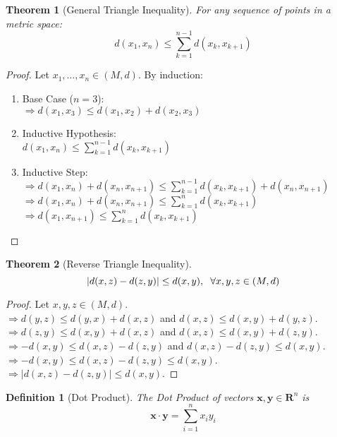 \documentclass{article}
\newtheorem{definition}{Definition}[section]
\newtheorem{theorem}{Theorem}[section]
\begin{document}
			\begin{theorem}[General Triangle Inequality]
			\label{general triangle inequality}
				For any sequence of points in a metric space:
				$$d(x_1,x_n) \leq \sum\limits_{k=1}^{n-1} d(x_k,x_{k+1})$$
			\end{theorem}
			\begin{proof}
				Let $x_1, \ldots, x_n \in (M, d)$. By induction:
				\begin{enumerate}
					\item Base Case ($n = 3$):\\
						$\Rightarrow d(x_1, x_3) \leq d(x_1, x_2) + d(x_2, x_3)$
					\item Inductive Hypothesis:\\
						$d(x_1,x_n) \leq \sum\limits_{k=1}^{n-1} d(x_k,x_{k+1})$
					\item Inductive Step:\\
						$\Rightarrow d(x_1,x_n) + d(x_n,x_{n+1}) \leq \sum\limits_{k=1}^{n-1}  d(x_k,x_{k+1}) + d(x_n,x_{n+1})$\\
						$\Rightarrow d(x_1,x_n) + d(x_n,x_{n+1}) \leq \sum\limits_{k=1}^n  d(x_k,x_{k+1})$\\
						$\Rightarrow d(x_1,x_{n+1}) \leq \sum\limits_{k=1}^{n} d(x_k,x_{k+1})$
					\end{enumerate}
			\end{proof}

			\begin{theorem}[Reverse Triangle Inequality]
			\label{reverse-triangle-inequality}
			$$|d(x, z) - d(z, y)| \leq d(x, y), \hspace{2 mm} \forall x, y, z \in (M, d)$$
			\end{theorem}
			\begin{proof}
				Let $x, y, z \in (M, d)$.\\
				$\Rightarrow d(y, z) \leq d(y, x) + d(x, z)$ and $d(x, z) \leq d(x, y) + d(y, z)$.\\
				$\Rightarrow d(z, y) \leq d(x, y) + d(x, z)$ and $d(x, z) \leq d(x, y) + d(z, y)$.\\
				$\Rightarrow -d(x, y) \leq d(x, z) - d(z, y)$ and $d(x, z) - d(z, y) \leq d(x, y)$.\\
				$\Rightarrow -d(x, y) \leq d(x, z) - d(z, y) \leq d(x, y)$.\\
				$\Rightarrow |d(x, z) - d(z, y)| \leq d(x, y)$.
			\end{proof}

			\begin{definition}[Dot Product]
				The Dot Product of vectors $\bm{x}, \bm{y} \in \mathbf{R}^n$ is $$\bm{x} \cdot \bm{y} = \sum\limits_{i=1}^n x_i y_i$$
			\end{definition}
\end{document}
